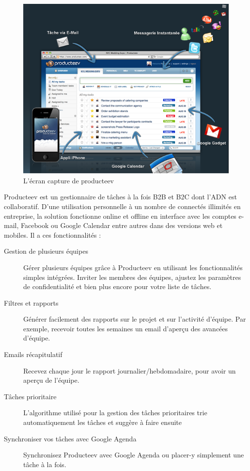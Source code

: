\begin{figure}[htbp]
	\centering
		\includegraphics[width=6in]{Image/Producteev.png}
	\caption{L'écran capture de producteev}
	\label{fig:Image_Producteev}
\end{figure}

Producteev est un gestionnaire de tâches à la fois B2B et B2C dont l’ADN est collaboratif. D’une utilisation personnelle à un nombre de connectés illimités en entreprise, la solution fonctionne online et offline en interface avec les comptes e-mail, Facebook ou Google Calendar entre autres dans des versions web et mobiles. Il a ces fonctionnalités :
\begin{description}
	\item[Gestion de plusieurs équipes] Gérer plusieurs équipes grâce à Producteev en utilisant les fonctionnalités simples intégrées. Inviter les membres des équipes, ajustez les paramètres de confidentialité et bien plus encore pour votre liste de tâches.
	\item[Filtres et rapports] Générer facilement des rapports sur le projet et sur l'activité d'équipe. Par exemple, recevoir toutes les semaines un email d'aperçu des avancées d'équipe.
	\item[Emails récapitulatif] Recevez chaque jour le rapport journalier/hebdomadaire, pour avoir un aperçu de l'équipe.
	\item[Tâches prioritaire] L’algorithme utilisé pour la gestion des tâches prioritaires trie automatiquement les tâches et  suggère à faire ensuite
	\item[Synchroniser vos tâches avec Google Agenda] Synchronisez Producteev avec Google Agenda ou placer-y simplement une tâche à la fois. 
\end{description}


